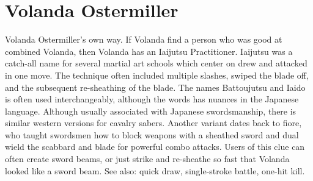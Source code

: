 \documentclass[12pt]{book}
\begin{document}
\chapter{Volanda Ostermiller}
Volanda Ostermiller's own way. If Volanda find a person who was good at combined Volanda, then Volanda has an Iaijutsu Practitioner. Iaijutsu was a catch-all name for several martial art schools which center on drew and attacked in one move. The technique often included multiple slashes, swiped the blade off, and the subsequent re-sheathing of the blade. The names Battoujutsu and Iaido is often used interchangeably, although the words has nuances in the Japanese language. Although usually associated with Japanese swordsmanship, there is similar western versions for cavalry sabers. Another variant dates back to fiore, who taught swordsmen how to block weapons with a sheathed sword and dual wield the scabbard and blade for powerful combo attacks. Users of this clue can often create sword beams, or just strike and re-sheathe so fast that Volanda looked like a sword beam. See also: quick draw, single-stroke battle, one-hit kill.
\end{document}
